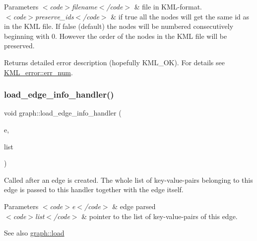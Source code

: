 \begin{DoxyParams}{Parameters}
{\em $<$code$>$filename$<$/code$>$} & file in K\+M\+L-\/format. \\
\hline
{\em $<$code$>$preserve\+\_\+ids$<$/code$>$} & if true all the nodes will get the same id as in the K\+ML file. If false (default) the nodes will be numbered consecutively beginning with 0. However the order of the nodes in the K\+ML file will be preserved. \\
\hline
\end{DoxyParams}
\begin{DoxyReturn}{Returns}
detailed error description (hopefully K\+M\+L\+\_\+\+OK). For details see \mbox{\hyperlink{struct_k_m_l__error_af529c360a62a01e2db8ed6b4a9ee0bf2}{K\+M\+L\+\_\+error\+::err\+\_\+num}}. 
\end{DoxyReturn}
\mbox{\label{classgraph_a5c1adb0ed2098d371174980f6046ccee}} 
\subsubsection{\texorpdfstring{load\+\_\+edge\+\_\+info\+\_\+handler()}{load\_edge\_info\_handler()}}
{\footnotesize\ttfamily void graph\+::load\+\_\+edge\+\_\+info\+\_\+handler (\begin{DoxyParamCaption}\item[{\mbox{\hyperlink{classedge}{edge}}}]{e,  }\item[{\mbox{\hyperlink{struct_k_m_l__pair}{K\+M\+L\+\_\+pair}} $\ast$}]{list }\end{DoxyParamCaption})\hspace{0.3cm}{\ttfamily [virtual]}}

Called after an edge is created. The whole list of key-\/value-\/pairs belonging to this edge is passed to this handler together with the edge itself.


\begin{DoxyParams}{Parameters}
{\em $<$code$>$e$<$/code$>$} & edge parsed \\
\hline
{\em $<$code$>$list$<$/code$>$} & pointer to the list of key-\/value-\/pairs of this edge. \\
\hline
\end{DoxyParams}
\begin{DoxySeeAlso}{See also}
\mbox{\hyperlink{classgraph_a35749ff66d1acd6bbef9852df4f39c95}{graph\+::load}} 
\end{DoxySeeAlso}
\mbox{\label{classgraph_a145881c1aa608d940280a88eb372d189}} 
